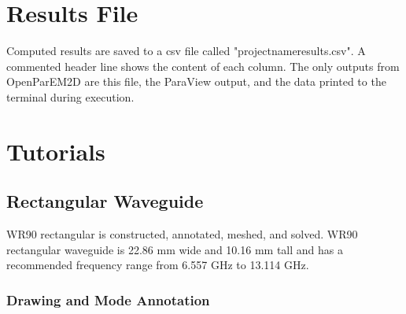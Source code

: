 \documentclass[titlepage]{article}
\renewcommand\_{\textunderscore\linebreak[1]}
\begin{document}
\section{Results File}

Computed results are saved to a csv file called "project\_name\_results.csv".  A commented header line shows the content of each column.  The only outputs from OpenParEM2D are this file, the ParaView output, and the data printed to the terminal during execution.

\section{Tutorials}

\subsection{Rectangular Waveguide}
WR90 rectangular is constructed, annotated, meshed, and solved.  WR90 rectangular waveguide is 22.86 mm wide and 10.16 mm tall and has a recommended frequency range from 6.557 GHz to 13.114 GHz.

\subsubsection{Drawing and Mode Annotation}
\end{document}
